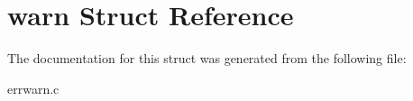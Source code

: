 \hypertarget{structwarn}{\section{warn Struct Reference}
\label{structwarn}
}


The documentation for this struct was generated from the following file\-:\begin{DoxyCompactItemize}
\item 
errwarn.\-c\end{DoxyCompactItemize}
